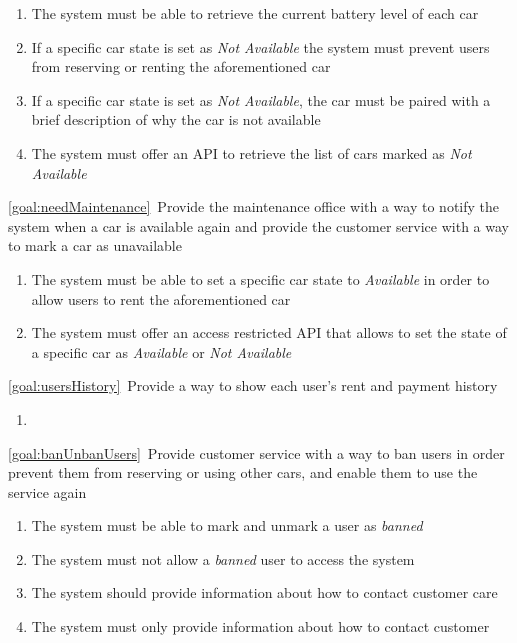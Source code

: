 \begin{description}
\begin{enumerate}[resume*]
   				\item The system must be able to retrieve the current battery level of each car
   				\item If a specific car state is set as \emph{Not Available} the system must 
   				prevent users from reserving or renting the aforementioned car
   				\item If a specific car state is set as \emph{Not Available}, the car must be paired
   				with a brief description of why the car is not available
   				\item The system must offer an API to retrieve the list of cars marked as \emph{Not
   				Available}
  			\end{enumerate}
		\item \ref{goal:needMaintenance}\ Provide the maintenance office with a way to notify the system when a car is available again and provide the customer service with a way to mark a car as unavailable
			\begin{enumerate}[resume*]
   				\item The system must be able to set a specific car state to \emph{Available} in order 
   				to allow users to rent the aforementioned car
   				\item The system must offer an access restricted API  that allows
   				to set the state of a specific car as \emph{Available} or \emph{Not Available}
  			\end{enumerate}
  		\item \ref{goal:usersHistory}\ Provide a way to show each user's rent and payment history
  			\begin{enumerate}[resume*]
  				\item
  			\end{enumerate}
  		\item \ref{goal:banUnbanUsers}\ Provide customer service with a way to ban users in order
  		prevent them from reserving or using other cars, and enable them to use the service again
  			\begin{enumerate}[resume*]
  				\item The system must be able to mark and unmark a user as \emph{banned} 
  				\item The system must not allow a \emph{banned} user to access the system
  				\item The system should provide information about how to contact customer care
   				\item The system must only provide information about how to contact customer

\end{enumerate}
\end{description}
